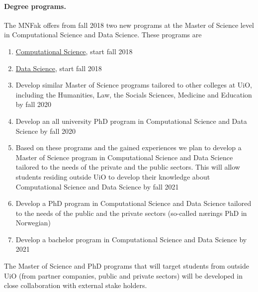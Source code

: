 \documentclass[%
oneside,                 %
final,                   %
10pt]{article}
\begin{document}
\paragraph{Degree programs.}
The MNFak  offers from fall 2018 two new programs at the Master of Science level in Computational Science and Data Science. These programs are
\begin{enumerate}
\item \href{{http://www.uio.no/english/studies/programmes/computational-science-master/index.html}}{Computational Science}, start fall 2018

\item \href{{http://www.uio.no/english/studies/programmes/datascience-master/index.html}}{Data Science}, start fall 2018

\item Develop similar Master of Science programs tailored to other colleges at UiO, including the Humanities, Law, the Socials Sciences, Medicine and Education by fall 2020

\item Develop an all university PhD program in Computational Science and Data Science by fall 2020

\item Based on these programs and the gained experiences we plan to develop a Master of Science program in Computational Science and Data Science tailored to the needs of the private and the public sectors. This will allow students residing outside UiO to develop their knowledge about Computational Science and Data Science by fall 2021

\item Develop a PhD program in Computational Science and Data Science tailored to the needs of the public and the private sectors (so-called nærings PhD in Norwegian)

\item Develop a bachelor program in Computational Science and Data Science by 2021
\end{enumerate}

\noindent
The Master of Science and PhD programs that will target students from outside UiO (from partner companies, public and private sectors)
will be developed in close collaboration with external stake holders. 
\end{document}
